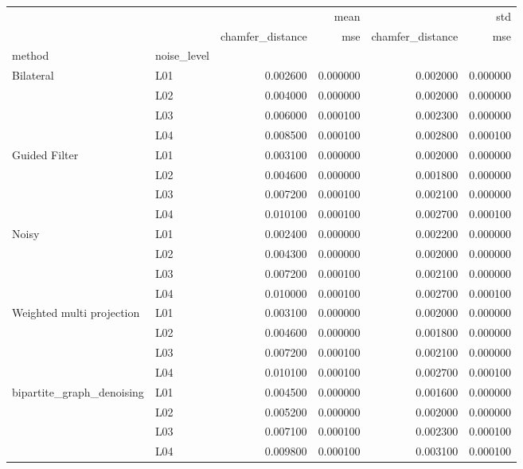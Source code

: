 \begin{tabular}{llrrrr}
\toprule
 &  & \multicolumn{2}{r}{mean} & \multicolumn{2}{r}{std} \\
 &  & chamfer_distance & mse & chamfer_distance & mse \\
method & noise_level &  &  &  &  \\
\midrule
\multirow[t]{4}{*}{Bilateral} & L01 & 0.002600 & 0.000000 & 0.002000 & 0.000000 \\
 & L02 & 0.004000 & 0.000000 & 0.002000 & 0.000000 \\
 & L03 & 0.006000 & 0.000100 & 0.002300 & 0.000000 \\
 & L04 & 0.008500 & 0.000100 & 0.002800 & 0.000100 \\
\cline{1-6}
\multirow[t]{4}{*}{Guided Filter} & L01 & 0.003100 & 0.000000 & 0.002000 & 0.000000 \\
 & L02 & 0.004600 & 0.000000 & 0.001800 & 0.000000 \\
 & L03 & 0.007200 & 0.000100 & 0.002100 & 0.000000 \\
 & L04 & 0.010100 & 0.000100 & 0.002700 & 0.000100 \\
\cline{1-6}
\multirow[t]{4}{*}{Noisy} & L01 & 0.002400 & 0.000000 & 0.002200 & 0.000000 \\
 & L02 & 0.004300 & 0.000000 & 0.002000 & 0.000000 \\
 & L03 & 0.007200 & 0.000100 & 0.002100 & 0.000000 \\
 & L04 & 0.010000 & 0.000100 & 0.002700 & 0.000100 \\
\cline{1-6}
\multirow[t]{4}{*}{Weighted multi projection} & L01 & 0.003100 & 0.000000 & 0.002000 & 0.000000 \\
 & L02 & 0.004600 & 0.000000 & 0.001800 & 0.000000 \\
 & L03 & 0.007200 & 0.000100 & 0.002100 & 0.000000 \\
 & L04 & 0.010100 & 0.000100 & 0.002700 & 0.000100 \\
\cline{1-6}
\multirow[t]{4}{*}{bipartite_graph_denoising} & L01 & 0.004500 & 0.000000 & 0.001600 & 0.000000 \\
 & L02 & 0.005200 & 0.000000 & 0.002000 & 0.000000 \\
 & L03 & 0.007100 & 0.000100 & 0.002300 & 0.000100 \\
 & L04 & 0.009800 & 0.000100 & 0.003100 & 0.000100 \\
\cline{1-6}
\bottomrule
\end{tabular}

